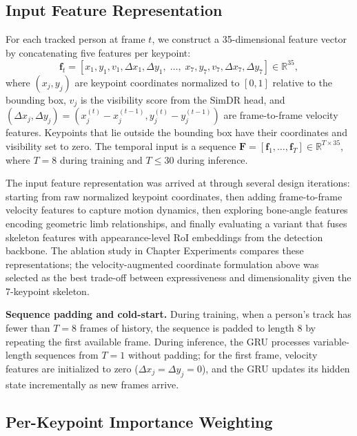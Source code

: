 \subsection{Input Feature Representation}
\label{subsec:action_input}

For each tracked person at frame $t$, we construct a 35-dimensional feature vector by concatenating five features per keypoint:
\begin{equation}
    \mathbf{f}_t = \left[ x_1, y_1, v_1, \Delta x_1, \Delta y_1, \;\ldots,\; x_7, y_7, v_7, \Delta x_7, \Delta y_7 \right] \in \mathbb{R}^{35},
    \label{eq:action_feature}
\end{equation}
where $(x_j, y_j)$ are keypoint coordinates normalized to $[0, 1]$ relative to the bounding box, $v_j$ is the visibility score from the SimDR head, and $(\Delta x_j, \Delta y_j) = (x_j^{(t)} - x_j^{(t-1)}, y_j^{(t)} - y_j^{(t-1)})$ are frame-to-frame velocity features. Keypoints that lie outside the bounding box have their coordinates and visibility set to zero. The temporal input is a sequence $\mathbf{F} = [\mathbf{f}_1, \ldots, \mathbf{f}_T] \in \mathbb{R}^{T \times 35}$, where $T = 8$ during training and $T \leq 30$ during inference.

The input feature representation was arrived at through several design iterations: starting from raw normalized keypoint coordinates, then adding frame-to-frame velocity features to capture motion dynamics, then exploring bone-angle features encoding geometric limb relationships, and finally evaluating a variant that fuses skeleton features with appearance-level RoI embeddings from the detection backbone. The ablation study in Chapter Experiments compares these representations; the velocity-augmented coordinate formulation above was selected as the best trade-off between expressiveness and dimensionality given the 7-keypoint skeleton.

\textbf{Sequence padding and cold-start.} During training, when a person's track has fewer than $T = 8$ frames of history, the sequence is padded to length 8 by repeating the first available frame. During inference, the GRU processes variable-length sequences from $T = 1$ without padding; for the first frame, velocity features are initialized to zero ($\Delta x_j = \Delta y_j = 0$), and the GRU updates its hidden state incrementally as new frames arrive.

\subsection{Per-Keypoint Importance Weighting}
\label{subsec:kpt_weight}

